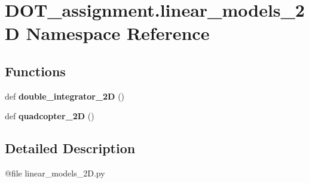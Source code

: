 \hypertarget{namespace_d_o_t__assignment_1_1linear__models__2_d}{}\section{D\+O\+T\+\_\+assignment.\+linear\+\_\+models\+\_\+2D Namespace Reference}
\label{namespace_d_o_t__assignment_1_1linear__models__2_d}
\subsection*{Functions}
\begin{DoxyCompactItemize}
\item 
\mbox{\label{namespace_d_o_t__assignment_1_1linear__models__2_d_a31424fbe908a3ce8ffd747e90373c99b}} 
def {\bfseries double\+\_\+integrator\+\_\+2D} ()
\item 
\mbox{\label{namespace_d_o_t__assignment_1_1linear__models__2_d_ac96769fff6553e451e6a18ab8f3093ea}} 
def {\bfseries quadcopter\+\_\+2D} ()
\end{DoxyCompactItemize}


\subsection{Detailed Description}
\begin{DoxyVerb}@file linear_models_2D.py
\end{DoxyVerb}
 